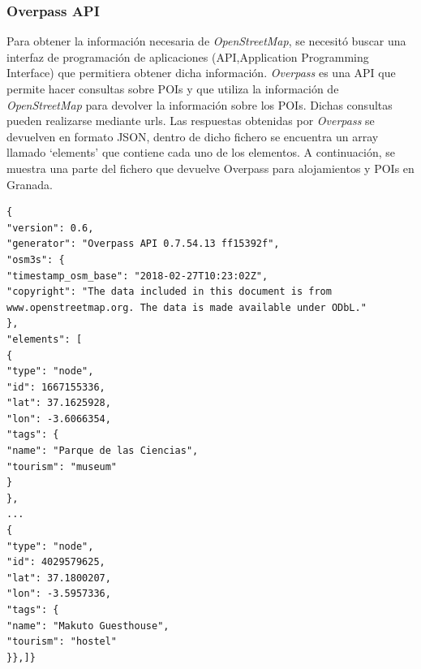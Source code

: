 \subsubsection[Overpass]{Overpass API}
Para obtener la información necesaria de \textit{OpenStreetMap}, se necesitó buscar una  interfaz de programación de aplicaciones (API,Application Programming Interface) que permitiera obtener dicha información. \textit{Overpass} es una API que permite hacer consultas sobre POIs y que utiliza la información de \textit{OpenStreetMap} para devolver la información sobre los POIs. Dichas consultas pueden realizarse mediante urls. Las respuestas obtenidas por \textit{Overpass} se devuelven en formato JSON, dentro de dicho fichero se encuentra un array llamado \enquote*{elements} que contiene cada uno de los elementos. A continuación, se muestra una parte del fichero que devuelve Overpass para alojamientos y POIs en Granada.\newline
\begin{lstlisting}[caption=Respuesta Overpass sobre alojamientos y POIs en Granada.]
{
"version": 0.6,
"generator": "Overpass API 0.7.54.13 ff15392f",
"osm3s": {
"timestamp_osm_base": "2018-02-27T10:23:02Z",
"copyright": "The data included in this document is from www.openstreetmap.org. The data is made available under ODbL."
},
"elements": [
{
"type": "node",
"id": 1667155336,
"lat": 37.1625928,
"lon": -3.6066354,
"tags": {
"name": "Parque de las Ciencias",
"tourism": "museum"
}
},
...
{
"type": "node",
"id": 4029579625,
"lat": 37.1800207,
"lon": -3.5957336,
"tags": {
"name": "Makuto Guesthouse",
"tourism": "hostel"
}},]}
\end{lstlisting}

